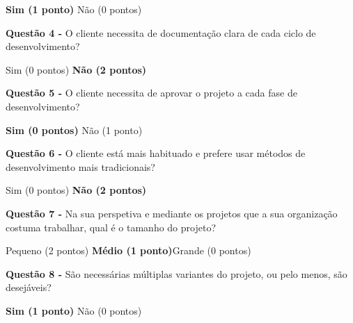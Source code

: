 \begin{framed}
\newline \begin{center} \textbf{Sim (1 ponto)} \hspace{30mm} Não (0 pontos)\end{center}
\vspace{2mm}
\newline\textbf{Questão 4 - } O cliente necessita de documentação clara de cada ciclo de desenvolvimento?
\newline \begin{center} Sim (0 pontos) \hspace{30mm} \textbf{Não (2 pontos)}\end{center}
\vspace{2mm}
\newline\textbf{Questão 5 - } O cliente necessita de aprovar o projeto a cada fase de desenvolvimento?
\newline \begin{center} \textbf{Sim (0 pontos)} \hspace{30mm} Não (1 ponto)\end{center}
\vspace{2mm}
\newline\textbf{Questão 6 - } O cliente está mais habituado e prefere usar métodos de desenvolvimento mais tradicionais?
\newline \begin{center} Sim (0 pontos) \hspace{30mm} \textbf{Não (2 pontos)}\end{center}
\newline\textbf{Questão 7 - } Na sua perspetiva e mediante os projetos que a sua organização costuma trabalhar, qual é o tamanho do projeto?
\newline \begin{center} Pequeno (2 pontos) \hspace{17mm} \textbf{Médio (1 ponto)}\hspace{17mm}Grande (0 pontos)\end{center}
\vspace{2mm}
\newline\textbf{Questão 8 - } São necessárias múltiplas variantes do projeto, ou pelo menos, são desejáveis?
\newline \begin{center} \textbf{Sim (1 ponto)} \hspace{30mm} Não (0 pontos)\end{center}
\vspace{2mm}

\end{framed}
